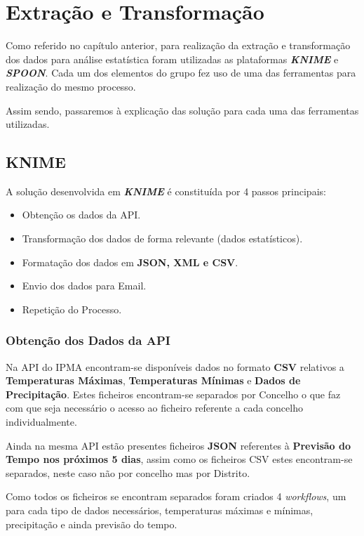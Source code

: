 \chapter{Extração e Transformação}

Como referido no capítulo anterior, para realização da extração e transformação dos dados para análise estatística foram utilizadas as plataformas \textbf{\textit{KNIME}} e \textbf{\textit{SPOON}}. Cada um dos elementos do grupo fez uso de uma das ferramentas para realização do mesmo processo.

Assim sendo, passaremos à explicação das solução para cada uma das ferramentas utilizadas.

\section*{KNIME}
A solução desenvolvida em \textbf{\textit{KNIME}} é constituída por 4 passos principais:
\begin{itemize}
    \item Obtenção os dados da API.
    \item Transformação dos dados de forma relevante (dados estatísticos).
    \item Formatação dos dados em \textbf{JSON, XML e CSV}.
    \item Envio dos dados para Email.
    \item Repetição do Processo.
\end{itemize}

\subsection*{Obtenção dos Dados da API}

Na API do IPMA encontram-se disponíveis dados no formato \textbf{CSV} relativos a \textbf{Temperaturas Máximas}, \textbf{Temperaturas Mínimas} e \textbf{Dados de Precipitação}. Estes ficheiros encontram-se separados por Concelho o que faz com que seja necessário o acesso ao ficheiro referente a cada concelho individualmente. 

Ainda na mesma API estão presentes ficheiros \textbf{JSON} referentes à \textbf{Previsão do Tempo nos próximos 5 dias}, assim como os ficheiros CSV estes encontram-se separados, neste caso não por concelho mas por Distrito. 

Como todos os ficheiros se encontram separados foram criados 4 \textit{workflows}, um para cada tipo de dados necessários, temperaturas máximas e mínimas, precipitação e ainda previsão do tempo.

